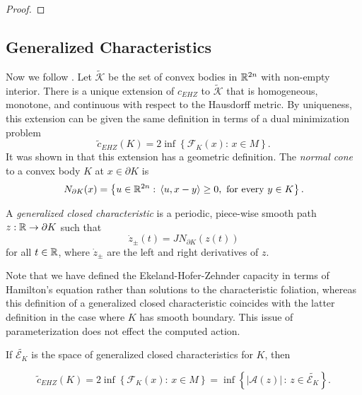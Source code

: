 \documentclass[../capacities_main.tex]{subfiles}
\begin{document}
	\begin{proof}
		
	\end{proof}
	
	\subsection{Generalized Characteristics}
	
	Now we follow \cite{artstein-avidan-ostrover}.  Let $\widetilde{\mathcal{K}}$ be the set of convex bodies in ${\mathbb R}^{2n}$ with non-empty interior.  There is a unique extension of $c_{EHZ}$ to $\widetilde{\mathcal{K}}$ that is homogeneous, monotone, and continuous with respect to the Hausdorff metric.  By uniqueness, this extension can be given the same definition in terms of a dual minimization problem \cite{artstein-avidan-ostrover}
	\begin{equation*}
	\tilde c_{EHZ}(K)  = 2\inf \left\{ \mathcal{F}_{K}(x) :\, x\in M\right\}.
	\end{equation*}
	It was shown in \cite{artstein-avidan-ostrover} that this extension has a geometric definition.  The \emph{normal cone} to a convex body $K$ at $x\in \partial K$ is 
	\begin{equation*}
	N_{\partial K}(x)  = \left\{ u \in {\mathbb R}^{2n} : \, \langle u, x-y \rangle \geq 0, \mbox{ for every } y \in K \right\}.
	\end{equation*} 
	\begin{Definition}
		A \emph{generalized closed characteristic} is a periodic, piece-wise smooth path $z: {\mathbb R} \rightarrow \partial K$ such that 
		\begin{equation*}
		\dot z_{\pm}(t) = JN_{\partial K}(z(t))
		\end{equation*} 
		for all $t\in {\mathbb R}$, where $\dot z_{\pm}$ are the left and right derivatives of $z$.
	\end{Definition}
	Note that we have defined the Ekeland-Hofer-Zehnder capacity in terms of Hamilton's equation rather than solutions to the characteristic foliation, whereas this definition of a generalized closed characteristic coincides with the latter definition in the case where $K$ has smooth boundary. This issue of parameterization does not effect the computed action.
	
	If $\widetilde{\mathcal{E}_K}$ is the space of generalized closed characteristics for $K$, then 
	\begin{Theorem}\cite{artstein-avidan-ostrover}
		\begin{equation*}
		\tilde c_{EHZ}(K) = 2\inf \left\{ \mathcal{F}_{K}(x) :\, x\in M\right\} = \inf\left\{ |\mathcal{A}(z)| \, :\, z \in \widetilde{\mathcal{E}_K}\right\}.
		\end{equation*}
	\end{Theorem}
	
	
\end{document}
